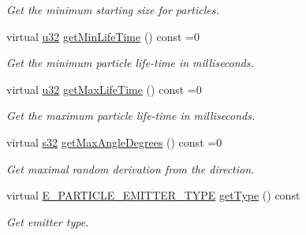 \begin{DoxyCompactItemize}
\begin{DoxyCompactList}\small\item\em Get the minimum starting size for particles. \end{DoxyCompactList}\item 
\mbox{\label{classirr_1_1scene_1_1IParticleEmitter_a35c512bd4cd12411ae0b7344f7511dd0}} 
virtual \hyperlink{namespaceirr_a0416a53257075833e7002efd0a18e804}{u32} \hyperlink{classirr_1_1scene_1_1IParticleEmitter_a35c512bd4cd12411ae0b7344f7511dd0}{get\+Min\+Life\+Time} () const =0
\begin{DoxyCompactList}\small\item\em Get the minimum particle life-\/time in milliseconds. \end{DoxyCompactList}\item 
\mbox{\label{classirr_1_1scene_1_1IParticleEmitter_a8e0455166f97db683686b5deb43da83f}} 
virtual \hyperlink{namespaceirr_a0416a53257075833e7002efd0a18e804}{u32} \hyperlink{classirr_1_1scene_1_1IParticleEmitter_a8e0455166f97db683686b5deb43da83f}{get\+Max\+Life\+Time} () const =0
\begin{DoxyCompactList}\small\item\em Get the maximum particle life-\/time in milliseconds. \end{DoxyCompactList}\item 
\mbox{\label{classirr_1_1scene_1_1IParticleEmitter_acce76d94b340feea5b35416e0a9705ae}} 
virtual \hyperlink{namespaceirr_ac66849b7a6ed16e30ebede579f9b47c6}{s32} \hyperlink{classirr_1_1scene_1_1IParticleEmitter_acce76d94b340feea5b35416e0a9705ae}{get\+Max\+Angle\+Degrees} () const =0
\begin{DoxyCompactList}\small\item\em Get maximal random derivation from the direction. \end{DoxyCompactList}\item 
\mbox{\label{classirr_1_1scene_1_1IParticleEmitter_a3eca8b0f8914803778cbfdf2731f3245}} 
virtual \hyperlink{namespaceirr_1_1scene_a3e251a881c886884a78adea2e546272b}{E\+\_\+\+P\+A\+R\+T\+I\+C\+L\+E\+\_\+\+E\+M\+I\+T\+T\+E\+R\+\_\+\+T\+Y\+PE} \hyperlink{classirr_1_1scene_1_1IParticleEmitter_a3eca8b0f8914803778cbfdf2731f3245}{get\+Type} () const
\begin{DoxyCompactList}\small\item\em Get emitter type. \end{DoxyCompactList}\end{DoxyCompactItemize}
